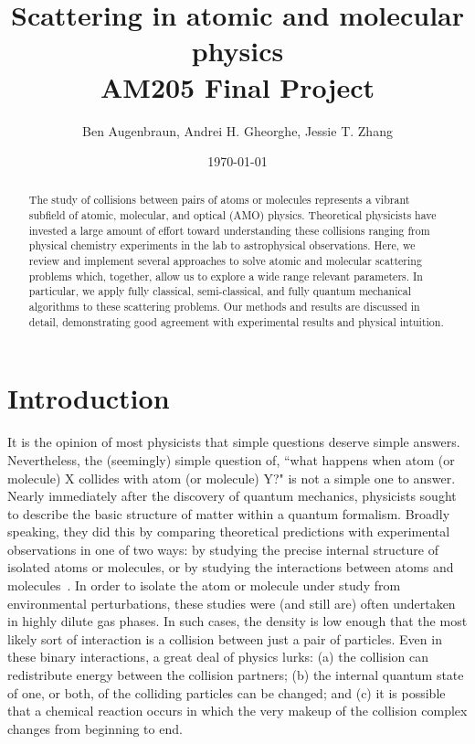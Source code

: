 \documentclass[%
 reprint,
 amsmath,amssymb,
 aps,
 nofootinbib
]{revtex4-1}
\begin{document}

\title{Scattering in atomic and molecular physics \\ AM205 Final Project}%

\author{Ben Augenbraun, Andrei H. Gheorghe, Jessie T. Zhang}

\date{\today}%

\begin{abstract}
The study of collisions between pairs of atoms or molecules represents a vibrant subfield of atomic, molecular, and optical (AMO) physics. Theoretical physicists have invested a large amount of effort toward understanding these collisions ranging from physical chemistry experiments in the lab to astrophysical observations. Here, we review and implement several approaches to solve atomic and molecular scattering problems which, together, allow us to explore a wide range relevant parameters. In particular, we apply fully classical, semi-classical, and fully quantum mechanical algorithms to these scattering problems. Our methods and results are discussed in detail, demonstrating good agreement with experimental results and physical intuition.
\end{abstract}

\maketitle

\section{\label{sec:Introduction}Introduction}
It is the opinion of most physicists that simple questions deserve simple answers. Nevertheless, the (seemingly) simple question of, ``what happens when atom (or molecule) X collides with atom (or molecule) Y?" is not a simple one to answer. Nearly immediately after the discovery of quantum mechanics, physicists sought to describe the basic structure of matter within a quantum formalism. Broadly speaking, they did this by comparing theoretical predictions with experimental observations in one of two ways: by studying the precise internal structure of isolated atoms or molecules, or by studying the interactions between atoms and molecules~\cite{SchrodPaper1926,DiracTextbook,QuantumScatteringTextbook}. In order to isolate the atom or molecule under study from environmental perturbations, these studies were (and still are) often undertaken in highly dilute gas phases. In such cases, the density is low enough that the most likely sort of interaction is a collision between just a pair of particles. Even in these binary interactions, a great deal of physics lurks: (a) the collision can redistribute energy between the collision partners; (b) the internal quantum state of one, or both, of the colliding particles can be changed; and (c) it is possible that a chemical reaction occurs in which the very makeup of the collision complex changes from beginning to end.
\end{document}
